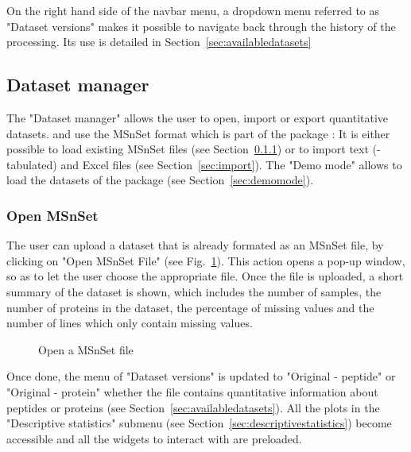 \documentclass[12pt]{article}
\begin{document}
{On the right hand side of the navbar menu, a dropdown menu referred to as 
"Dataset versions" makes it possible to navigate back through the history of 
the processing. Its use is detailed in Section~\ref{sec:availabledatasets}
}


\subsection{Dataset manager}
The "Dataset manager" allows the user to open, import or export quantitative 
datasets.  and  use the MSnSet format which 
is part of the package :
It is either possible to load existing MSnSet files (see 
Section~\ref{sec:load}) or to import text (-tabulated) and Excel files (see 
Section~\ref{sec:import}). The "Demo mode" allows to load the datasets of the 
package  (see Section~\ref{sec:demomode}).


\subsubsection{Open MSnSet} \label{sec:load}
The user can upload a dataset that is already formated as an MSnSet file, by 
clicking on "Open MSnSet File" (see Fig.~\ref{fig:open}). This action opens a 
pop-up window, so as to let the user choose the appropriate file. Once the 
file is uploaded, a short summary of the dataset is shown, which includes the 
number of samples, the number of proteins in the dataset, the percentage of 
missing values and the number of lines which only contain missing 
values.\newline
\begin {figure}
\centering
{}
\caption{Open a MSnSet file}\label{fig:open}
\end {figure}
{Once done, the menu of "Dataset versions" is updated to "Original - peptide" 
or "Original - protein" whether the file contains quantitative information 
about peptides or proteins (see Section~\ref{sec:availabledatasets}).} All 
the plots in the "Descriptive statistics" submenu (see 
Section~\ref{sec:descriptivestatistics}) become accessible and all the 
widgets to interact with  are preloaded.
\end{document}
